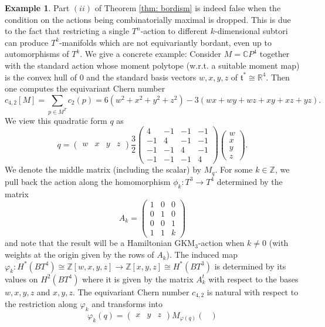 \documentclass[12pt,a4paper]{amsart}
\newcommand{\RR}{\mathbb{R}}
\newcommand{\CC}{\mathbb{C}}
\newcommand{\ZZ}{\mathbb{Z}}
\theoremstyle{plain}
\theoremstyle{definition}
\newtheorem{ex}[thm]{Example}
\begin{document}
\begin{ex} \label{ex: eqbordism}
Part $(ii)$ of Theorem \ref{thm: bordism} is indeed false when the condition on the actions being combinatorially maximal is dropped. This is due to the fact that restricting a single $T^n$-action to different $k$-dimensional subtori can produce $T^k$-manifolds which are not equivariantly bordant, even up to automorphisms of $T^k$. We give a concrete example: Consider $M=\CC P^4$ together with the standard action whose moment polytope (w.r.t. a suitable moment map) is the convex hull of $0$ and the standard basis vectors $w,x,y,z$ of $\mathfrak{t}^*\cong \RR^4$. Then one computes the equivariant Chern number
\[ c_{4,2}[M]=\sum_{p\in M^T} c_2(p) = 6(w^2+x^2+y^2+z^2)-3(wx+wy+wz+xy+xz+yz).\]
We view this quadratic form $q$ as
\[q=\begin{pmatrix}
w&x&y&z
\end{pmatrix} \frac{3}{2}\begin{pmatrix}
4 & -1& -1 & -1\\ -1& 4& -1& -1\\ -1& -1& 4& -1\\ -1 & -1& -1& 4
\end{pmatrix}
\begin{pmatrix}
w\\x\\y\\z
\end{pmatrix}.\]
We denote the middle matrix (including the scalar) by $M_q$. For some $k\in \ZZ$, we pull back the action along the homomorphism $\phi_k\colon T^3\rightarrow T^4$ determined by the matrix
\[A_k=\begin{pmatrix}
1 & 0 & 0\\ 0 & 1 &0\\ 0&0&1\\ 1 & 1 & k
\end{pmatrix}\]
and note that the result will be a Hamiltonian GKM$_3$-action when $k\neq 0$ (with weights at the origin given by the rows of $A_k$).
The induced map $\varphi_k\colon H^*(BT^4)\cong \ZZ[w,x,y,z]\rightarrow \ZZ[x,y,z]\cong H^*(BT^3)$ is determined by its values on $H^2(BT^4)$ where it is given by the matrix $A_k^t$ with respect to the bases $w,x,y,z$ and $x,y,z$.
The equivariant Chern number $c_{4,2}$ is natural with respect to the restriction along
$\varphi_{k}$ and transforms into
\[\varphi_k(q)=\begin{pmatrix}
x&y&z
\end{pmatrix}
M_{\varphi(q)}
\begin{pmatrix}

\end{pmatrix}\]
\end{ex}
\end{document}
